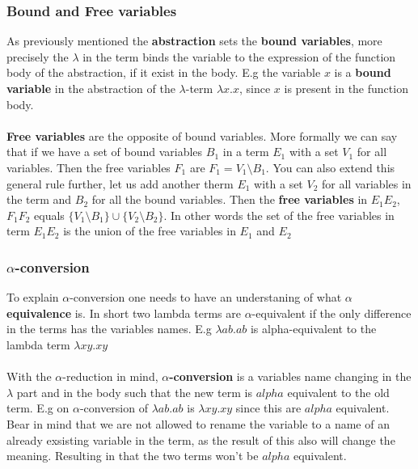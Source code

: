 \subsubsection{Bound and Free variables}
As previously mentioned the \textbf{abstraction} sets the \textbf{bound variables}, 
more precisely the $\lambda$ in the term binds the variable to the expression of the function body of the abstraction,
if it exist in the body.
E.g the variable $x$ is a \textbf{bound variable} in the abstraction of the $\lambda$-term $\lambda x.x$, since $x$ is present in the function body.
\\ \\
\textbf{Free variables} are the opposite of bound variables. More formally we can say that if we have 
a set of bound variables $B_1$ in a term $E_1$ with a set $V_1$ for all variables.  
Then the free variables $F_1$ are $F_1 = V_1\setminus B_1$. You can also extend this general rule further, 
let us add another therm $E_1$ with a set $V_2$ for all variables in the term and $B_2 $ for all the bound variables. 
Then the \textbf{free variables} in $E_1 E_2$, $F_1 F_2$ equals $ \{V_1\setminus B_1\} \cup \{V_2\setminus B_2\}$. 
In other words the set of the free variables in term $E_1 E_2$ is the union of the free variables in $E_1$ and $E_2$

\subsubsection{$\alpha$-conversion}
To explain $\alpha$-conversion  one needs to have an understaning of what \textbf{$\alpha$ equivalence} is.
In short two lambda terms are $\alpha$-equivalent if the only difference in the terms has the variables names.
E.g $\lambda ab.ab$ is alpha-equivalent to the lambda term $\lambda xy.xy$ 
\\ \\
With the $\alpha$-reduction in mind, \textbf{$\alpha$-conversion} is a variables name changing in the $\lambda$ part 
and in the body such that the new term is $alpha$ equivalent to the old term. E.g on $\alpha$-conversion of $\lambda ab.ab$ is $\lambda xy.xy$ 
since this are $alpha$ equivalent. Bear in mind that we are not allowed to rename the variable to a name of an already exsisting variable in the term,
as the result of this also will change the meaning. Resulting in that the two terms won't be $alpha$ equivalent.

